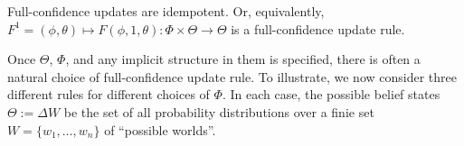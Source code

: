 \begin{CFaxioms}
	\item
	Full-confidence updates are idempotent. Or,
	equivalently,
	$F^1 = (\phi, \theta) \mapsto F(\phi,1,\theta): \Phi \times \Theta \to \Theta$ is a full-confidence
	update rule.
	\label{ax:idemp}
\end{CFaxioms}




Once $\Theta$, $\Phi$, and any implicit structure in them is specified, there is often a natural choice of full-confidence update rule.
To illustrate, we now consider three different rules for different choices of $\Phi$.
In each case, the possible belief states $\Theta := \Delta W$ be the set of all probability distributions over a finie set $W = \{w_1, \ldots, w_n\}$ of ``possible worlds''.

